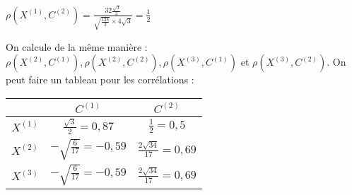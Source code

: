 \documentclass[a4paper, 12pt]{article}
\begin{document}
\begin{center}
$\rho (X^{(1)}, C^{(2)}) = \frac{32 \frac{\sqrt{3}}{3}}{\sqrt{\frac{128}{3}} \times 4 \sqrt{3}} = \frac{1}{2}$ \\
\end{center}

On calcule de la même manière : $\rho (X^{(2)}, C^{(1)}), \rho (X^{(2)}, C^{(2)}), \rho (X^{(3)}, C^{(1)})$ et $\rho (X^{(3)}, C^{(2)})$. On peut faire un tableau pour les corrélations : \\

\begin{center}
\Large
\begin{tabular}{l|c|c|}
& $C^{(1)}$ & $C^{(2)}$ \\
\hline
$X^{(1)}$ & $\frac{\sqrt{3}}{2} = 0,87$ & $\frac{1}{2} = 0,5$ \\
$X^{(2)}$ & $- \sqrt{\frac{6}{17}} = - 0,59$ & $\frac{2 \sqrt{34}}{17} = 0,69$ \\
$X^{(3)}$ & $- \sqrt{\frac{6}{17}} = - 0,59$ & $\frac{2 \sqrt{34}}{17} = 0,69$ \\
\end{tabular}
\end{center}
\end{document}
